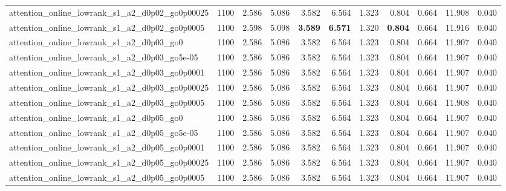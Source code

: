 \begin{table}[t]
\begin{tabular}{lrrrrrrrrrr}
attention_online_lowrank_s1_a2_d0p02_go0p00025 & 1100 & 2.586 & 5.086 & 3.582 & 6.564 & 1.323 & 0.804 & 0.664 & 11.908 & 0.040 \\
attention_online_lowrank_s1_a2_d0p02_go0p0005 & 1100 & 2.598 & 5.098 & \textbf{3.589} & \textbf{6.571} & 1.320 & \textbf{0.804} & 0.664 & 11.916 & 0.040 \\
attention_online_lowrank_s1_a2_d0p03_go0 & 1100 & 2.586 & 5.086 & 3.582 & 6.564 & 1.323 & 0.804 & 0.664 & 11.907 & 0.040 \\
attention_online_lowrank_s1_a2_d0p03_go5e-05 & 1100 & 2.586 & 5.086 & 3.582 & 6.564 & 1.323 & 0.804 & 0.664 & 11.907 & 0.040 \\
attention_online_lowrank_s1_a2_d0p03_go0p0001 & 1100 & 2.586 & 5.086 & 3.582 & 6.564 & 1.323 & 0.804 & 0.664 & 11.907 & 0.040 \\
attention_online_lowrank_s1_a2_d0p03_go0p00025 & 1100 & 2.586 & 5.086 & 3.582 & 6.564 & 1.323 & 0.804 & 0.664 & 11.907 & 0.040 \\
attention_online_lowrank_s1_a2_d0p03_go0p0005 & 1100 & 2.586 & 5.086 & 3.582 & 6.564 & 1.323 & 0.804 & 0.664 & 11.908 & 0.040 \\
attention_online_lowrank_s1_a2_d0p05_go0 & 1100 & 2.586 & 5.086 & 3.582 & 6.564 & 1.323 & 0.804 & 0.664 & 11.907 & 0.040 \\
attention_online_lowrank_s1_a2_d0p05_go5e-05 & 1100 & 2.586 & 5.086 & 3.582 & 6.564 & 1.323 & 0.804 & 0.664 & 11.907 & 0.040 \\
attention_online_lowrank_s1_a2_d0p05_go0p0001 & 1100 & 2.586 & 5.086 & 3.582 & 6.564 & 1.323 & 0.804 & 0.664 & 11.907 & 0.040 \\
attention_online_lowrank_s1_a2_d0p05_go0p00025 & 1100 & 2.586 & 5.086 & 3.582 & 6.564 & 1.323 & 0.804 & 0.664 & 11.907 & 0.040 \\
attention_online_lowrank_s1_a2_d0p05_go0p0005 & 1100 & 2.586 & 5.086 & 3.582 & 6.564 & 1.323 & 0.804 & 0.664 & 11.907 & 0.040 \\
\bottomrule
\end{tabular}
\end{table}